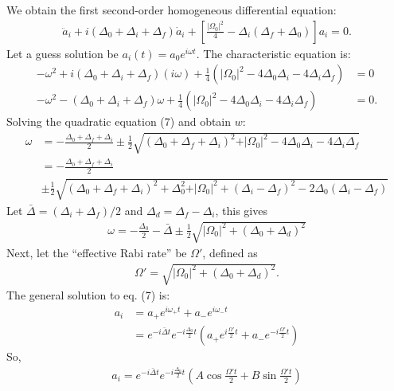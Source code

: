 \documentclass{article}
\begin{document}
We obtain the first second-order homogeneous differential equation:
\begin{align}
\ddot{a}_i + i\left( \Delta_0 + \Delta_i + \Delta_f\right)\dot{a}_i + \left[ \frac{\vert \Omega_0\vert^2}{4} - \Delta_i\left( \Delta_f + \Delta_0 \right)  \right]a_i = 0.
\end{align}
Let a guess solution be $a_i(t) = a_0e^{i\omega t}$. The characteristic equation is:
\begin{align}
-\omega^2 + i\left( \Delta_0 + \Delta_i + \Delta_f\right)(i\omega) + \frac{1}{4}(\vert\Omega_0\vert^2 - 4\Delta_0\Delta_i - 4\Delta_i\Delta_f) &= 0 \nonumber\\
-\omega^2 - \left( \Delta_0 + \Delta_i + \Delta_f\right)\omega + \frac{1}{4}(\vert\Omega_0\vert^2 - 4\Delta_0\Delta_i - 4\Delta_i\Delta_f) &= 0.
\end{align}
Solving the quadratic equation (7) and obtain $w$:
\begin{align}
\omega &= -\frac{\Delta_0 + \Delta_f + \Delta_i}{2} \pm\frac{1}{2}\sqrt{(\Delta_0 + \Delta_f + \Delta_i)^2 + \vert\Omega_0\vert^2 - 4\Delta_0\Delta_i - 4\Delta_i\Delta_f }\nonumber\\
&= -\frac{\Delta_0 + \Delta_f + \Delta_i}{2}\nonumber\\ &\pm\frac{1}{2}\sqrt{(\Delta_0 + \Delta_f + \Delta_i)^2 + \Delta^2_0 + \vert\Omega_0\vert^2 + (\Delta_i-\Delta_f)^2 -2\Delta_0(\Delta_i-\Delta_f) }
\end{align}
Let $\bar{\Delta} = (\Delta_i + \Delta_f)/2$ and $\Delta_d = \Delta_f - \Delta_i$, this gives
\begin{align}
\boxed{\omega = -\frac{\Delta_0}{2} - \bar{\Delta} \pm \frac{1}{2}\sqrt{\vert\Omega_0\vert^2 + (\Delta_0 + \Delta_d)^2}}
\end{align}
Next, let the ``effective Rabi rate'' be $\Omega'$, defined as
\begin{align}
\Omega' = \sqrt{\vert\Omega_0\vert^2 + (\Delta_0 + \Delta_d)^2}.
\end{align}
The general solution to eq. (7) is:
\begin{align}
a_i &= a_+e^{i\omega_+ t} + a_-e^{i\omega_- t}\nonumber\\
&= e^{-i\bar{\Delta}t}e^{-i\frac{\Delta_0}{2}t}\left(a_+e^{i\frac{\Omega'}{2}t} + a_-e^{-i\frac{\Omega'}{2}t} \right) 
\end{align}
So,
\begin{align}
\boxed{a_i = e^{-i\bar{\Delta}t}e^{-i\frac{\Delta_0}{2}t}\left(A\cos\frac{\Omega't}{2} + B\sin\frac{\Omega't}{2} \right) }
\end{align}
\end{document}
